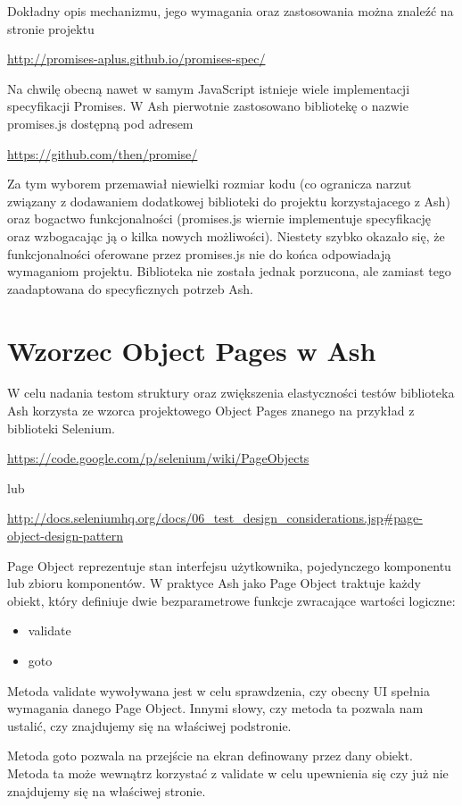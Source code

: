 \documentclass[brudnopis]{xmgr}
\begin{document}
Dokładny opis mechanizmu, jego wymagania oraz zastosowania można znaleźć na  stronie projektu

\url{http://promises-aplus.github.io/promises-spec/}

Na chwilę obecną nawet w samym JavaScript istnieje wiele implementacji specyfikacji Promises. W Ash pierwotnie zastosowano bibliotekę o nazwie promises.js dostępną pod adresem

\url{https://github.com/then/promise/}

Za tym wyborem przemawiał niewielki rozmiar kodu (co ogranicza narzut związany z dodawaniem dodatkowej biblioteki do projektu korzystajacego z Ash) oraz bogactwo funkcjonalności (promises.js wiernie implementuje specyfikację oraz wzbogacając ją o kilka  nowych możliwości). Niestety szybko okazało się, że funkcjonalności oferowane przez promises.js nie do końca odpowiadają wymaganiom projektu. Biblioteka nie została jednak porzucona, ale zamiast tego zaadaptowana do specyficznych potrzeb Ash.  

\section{Wzorzec Object Pages w Ash}

W celu nadania testom struktury oraz zwiększenia elastyczności testów biblioteka Ash korzysta ze wzorca projektowego Object Pages znanego na przykład z biblioteki Selenium. 

\url{https://code.google.com/p/selenium/wiki/PageObjects}

lub

\url{http://docs.seleniumhq.org/docs/06\_test\_design\_considerations.jsp\#page-object-design-pattern}

Page Object reprezentuje stan interfejsu użytkownika, pojedynczego komponentu lub zbioru komponentów. W praktyce Ash jako Page Object traktuje każdy obiekt, który definiuje dwie bezparametrowe funkcje zwracające wartości logiczne:

\begin{itemize}
  \item validate
  \item goto
\end{itemize}

Metoda validate wywoływana jest w celu sprawdzenia, czy obecny UI spełnia wymagania danego Page Object. Innymi słowy, czy metoda ta pozwala nam ustalić, czy znajdujemy się na właściwej podstronie. 

Metoda goto pozwala na przejście na ekran definowany przez dany obiekt. Metoda ta może wewnątrz korzystać z validate w celu upewnienia się czy już nie znajdujemy się na właściwej stronie. 
\end{document}
